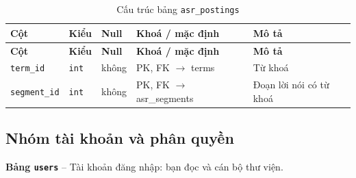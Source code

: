 \setlength{\tabcolsep}{4pt}
\begin{longtable}{>{\raggedright\arraybackslash}p{}>{\raggedright\arraybackslash}p{}>{\centering\arraybackslash}p{}>{\raggedright\arraybackslash}p{}>{\raggedright\arraybackslash}p{}}
\caption{Cấu trúc bảng \texttt{asr\_postings}}\label{tab:col_asr_postings}\\
\toprule \textbf{Cột} & \textbf{Kiểu} & \textbf{Null} & \textbf{Khoá / mặc định} & \textbf{Mô tả} \\ \midrule \endfirsthead
\toprule \textbf{Cột} & \textbf{Kiểu} & \textbf{Null} & \textbf{Khoá / mặc định} & \textbf{Mô tả} \\ \midrule \endhead
\bottomrule \endfoot
\texttt{term\_id} & {\footnotesize\texttt{int}} & không & PK, FK $\rightarrow$ terms & Từ khoá \\
\texttt{segment\_id} & {\footnotesize\texttt{int}} & không & PK, FK $\rightarrow$ asr\_segments & Đoạn lời nói có từ khoá \\
\end{longtable}

\subsection{Nhóm tài khoản và phân quyền}

\textbf{Bảng \texttt{users}} -- Tài khoản đăng nhập: bạn đọc và cán bộ thư viện.

